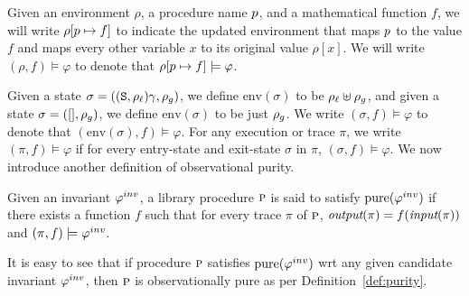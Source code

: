 
Given an environment $\rho$, a procedure name $p$, and a mathematical function $f$, we will write
$\rho[p \mapsto f]$ to indicate the updated environment that maps
$p$ to the value $f$ and maps every
other variable $x$ to its original value $\rho[x]$.
We will write $(\rho,f) \models \varphi$ to denote that $\rho[p \mapsto f] \models \varphi$.

Given a state $\sigma = ((\texttt{S},\rho_\ell)\gamma,\rho_g)$, 
we define $\text{env}(\sigma)$ to be $\rho_\ell \uplus \rho_g$,  and given a
state $\sigma = ([],\rho_g)$, we define $\text{env}(\sigma)$ to be just $\rho_g$.
We write $(\sigma,f) \models \varphi$ to denote that $(\text{env}(\sigma),f) \models \varphi$.
For any execution or trace $\pi$, we write $(\pi,f) \models \varphi$ if for every entry-state and exit-state
$\sigma$ in $\pi$, $(\sigma,f) \models \varphi$.
We now introduce another definition of observational purity.
\begin{definition}
\label{def:pureinv}
Given an invariant $\varphi^{inv}$, 
a library procedure $\textsc{p}$ is said to satisfy $\mathrm{pure}(\varphi^{inv})$ if
there exists a function $f$ such that for every trace $\pi$ of $\textsc{p}$,
$\textit{output}(\pi) = f(\textit{input}(\pi))$ and $(\pi,f) \models \varphi^{inv}$.
\end{definition}
It is easy to see that if procedure $\textsc{p}$ satisfies $\mathrm{pure}(\varphi^{inv})$ wrt any
given candidate invariant $\varphi^{inv}$, then $\textsc{p}$ is observationally pure as
per Definition~\ref{def:purity}. 




